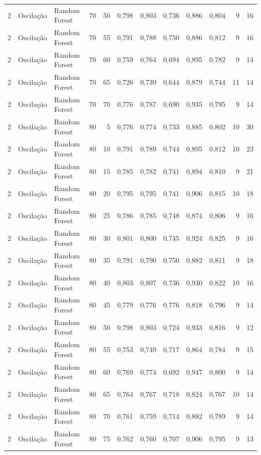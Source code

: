 \begin{longtable}{@{}rllrrrrrrrrr@{}}
2 & Oscilação & Random Forest & 70 & 50 & 0,798 & 0,803 & 0,736 & 0,886 & 0,804 & 9 & 16 \\
2 & Oscilação & Random Forest & 70 & 55 & 0,791 & 0,788 & 0,750 & 0,886 & 0,812 & 9 & 16 \\
2 & Oscilação & Random Forest & 70 & 60 & 0,759 & 0,764 & 0,694 & 0,895 & 0,782 & 9 & 14 \\
2 & Oscilação & Random Forest & 70 & 65 & 0,726 & 0,739 & 0,644 & 0,879 & 0,744 & 11 & 14 \\
2 & Oscilação & Random Forest & 70 & 70 & 0,776 & 0,787 & 0,690 & 0,935 & 0,795 & 9 & 14 \\
2 & Oscilação & Random Forest & 80 & 5 & 0,776 & 0,774 & 0,733 & 0,885 & 0,802 & 10 & 30 \\
2 & Oscilação & Random Forest & 80 & 10 & 0,791 & 0,789 & 0,744 & 0,895 & 0,812 & 10 & 23 \\
2 & Oscilação & Random Forest & 80 & 15 & 0,785 & 0,782 & 0,741 & 0,894 & 0,810 & 9 & 21 \\
2 & Oscilação & Random Forest & 80 & 20 & 0,795 & 0,795 & 0,741 & 0,906 & 0,815 & 10 & 18 \\
2 & Oscilação & Random Forest & 80 & 25 & 0,786 & 0,785 & 0,748 & 0,874 & 0,806 & 9 & 16 \\
2 & Oscilação & Random Forest & 80 & 30 & 0,801 & 0,800 & 0,745 & 0,924 & 0,825 & 9 & 16 \\
2 & Oscilação & Random Forest & 80 & 35 & 0,791 & 0,790 & 0,750 & 0,882 & 0,811 & 9 & 18 \\
2 & Oscilação & Random Forest & 80 & 40 & 0,803 & 0,807 & 0,736 & 0,930 & 0,822 & 10 & 16 \\
2 & Oscilação & Random Forest & 80 & 45 & 0,779 & 0,776 & 0,776 & 0,818 & 0,796 & 9 & 14 \\
2 & Oscilação & Random Forest & 80 & 50 & 0,798 & 0,803 & 0,724 & 0,933 & 0,816 & 9 & 12 \\
2 & Oscilação & Random Forest & 80 & 55 & 0,753 & 0,749 & 0,717 & 0,864 & 0,784 & 9 & 15 \\
2 & Oscilação & Random Forest & 80 & 60 & 0,769 & 0,774 & 0,692 & 0,947 & 0,800 & 9 & 14 \\
2 & Oscilação & Random Forest & 80 & 65 & 0,764 & 0,767 & 0,718 & 0,824 & 0,767 & 10 & 14 \\
2 & Oscilação & Random Forest & 80 & 70 & 0,761 & 0,759 & 0,714 & 0,882 & 0,789 & 9 & 14 \\
2 & Oscilação & Random Forest & 80 & 75 & 0,762 & 0,760 & 0,707 & 0,906 & 0,795 & 9 & 13 \\

\end{longtable}
